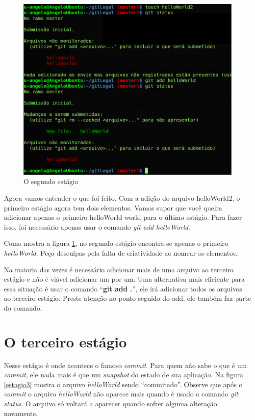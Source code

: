 \documentclass[12pt,openright,oneside,a4paper,english,brazil]{abntex2}
\begin{document}
\begin{figure}[h]
	\caption{\label{estagio2}O segundo estágio}
	\begin{center}
		\includegraphics[width=1\linewidth]{imagens/estagio2}
	\end{center}
\end{figure}

Agora vamos entender o que foi feito. Com a adição do arquivo helloWorld2, o primeiro estágio agora tem dois elementos. Vamos supor que você queira adicionar apenas o primeiro helloWorld world para o último estágio. Para fazer isso, foi necessário apenas usar o comando \textit{git add helloWorld}.

Como mostra a figura \ref{estagio2}, no segundo estágio encontra-se apenas o primeiro \textit{helloWorld}. Peço desculpas pela falta de criatividade ao nomear os elementos.

Na maioria das vezes é necessário adicionar mais de uma arquivo ao terceiro estágio e não é viável adicionar um por um. Uma alternativa mais eficiente para essa situação é usar o comando ``\textbf{git add .}'', ele irá adicionar todos os arquivos ao terceiro estágio. Preste atenção no ponto seguido do add, ele também faz parte do comando.

\section{O terceiro estágio}

Nesse estágio é onde acontece o famoso \textit{commit}. Para quem não sabe o que é um \textit{commit}, ele nada mais é que um \textit{snapshot} do estado de sua aplicação. Na figura \ref{estagio3} mostra o arquivo \textit{helloWorld} sendo ``commitado''. Observe que após o \textit{commit} o arquivo \textit{helloWorld} não aparece mais quando é usado o comando \textit{git status}. O arquivo só voltará a aparecer quando sofrer alguma alteração novamente. 
\end{document}
